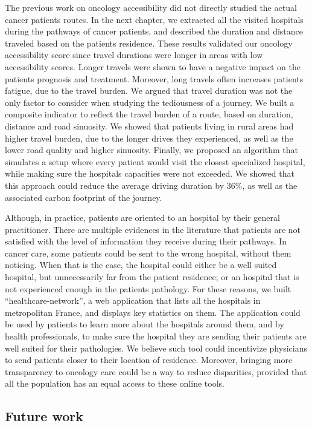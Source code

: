The previous work on oncology accessibility did not directly studied the actual
cancer patients routes. In the next chapter, we extracted all the visited
hospitals during the pathways of cancer patients, and described the duration and
distance traveled based on the patients residence. These results validated our
oncology accessibility score since travel durations were longer in areas with
low accessibility scores. Longer travels were shown to have a negative impact on
the patients prognosis and treatment. Moreover, long travels often increases
patients fatigue, due to the travel burden. We argued that travel duration was
not the only factor to consider when studying the tediousness of a journey. We
built a composite indicator to reflect the travel burden of a route, based on
duration, distance and road sinuosity. We showed that patients living in rural
areas had higher travel burden, due to the longer drives they experienced, as
well as the lower road quality and higher sinuosity. Finally, we proposed an
algorithm that simulates a setup where every patient would visit the closest
specialized hospital, while making sure the hospitals capacities were not
exceeded. We showed that this approach could reduce the average driving
duration by 36\%, as well as the associated carbon footprint of the journey.

Although, in practice, patients are oriented to an hospital by their general
practitioner. There are multiple evidences in the literature that patients
are not satisfied with the level of information they receive during their
pathways. In cancer care, some patients could be sent to the wrong hospital,
without them noticing. When that is the case, the hospital could either be
a well suited hospital, but unnecessarily far from the patient residence;
or an hospital that is not experienced enough in the patients pathology. For
these reasons, we built ``healthcare-network'', a web application that lists
all the hospitals in metropolitan France, and displays key statistics on them.
The application could be used by patients to learn more about the hospitals
around them, and by health professionals, to make sure the hospital they are
sending their patients are well suited for their pathologies. We believe such
tool could incentivize physicians to send patients closer to their location
of residence. Moreover, bringing more transparency to oncology care could be
a way to reduce disparities, provided that all the population has an equal
access to these online tools.

\subsection*{Future work}

